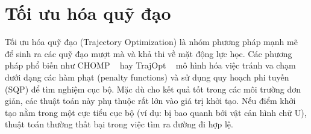 \section{Tối ưu hóa quỹ đạo}

Tối ưu hóa quỹ đạo (Trajectory Optimization) là nhóm phương pháp mạnh mẽ để sinh ra các quỹ đạo mượt mà và khả thi về mặt động lực học. Các phương pháp phổ biến như CHOMP ~\cite{Zucker2013_CHOMP} hay TrajOpt ~\cite{Schulman2014_TrajOpt} mô hình hóa việc tránh va chạm dưới dạng các hàm phạt (penalty functions) và sử dụng quy hoạch phi tuyến (SQP) để tìm nghiệm cục bộ. Mặc dù cho kết quả tốt trong các môi trường đơn giản, các thuật toán này phụ thuộc rất lớn vào giá trị khởi tạo. Nếu điểm khởi tạo nằm trong một cực tiểu cục bộ (ví dụ: bị bao quanh bởi vật cản hình chữ U), thuật toán thường thất bại trong việc tìm ra đường đi hợp lệ.
